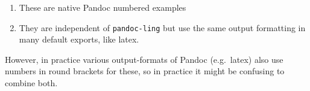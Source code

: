 \documentclass[
]{article}
\begin{document}
\begin{enumerate}
\def\labelenumi{(\arabic{enumi})}
\item
  These are native Pandoc numbered examples
\item
  They are independent of \texttt{pandoc-ling} but use the same output
  formatting in many default exports, like latex.
\end{enumerate}

However, in practice various output-formats of Pandoc (e.g.~latex) also
use numbers in round brackets for these, so in practice it might be
confusing to combine both.
\end{document}
